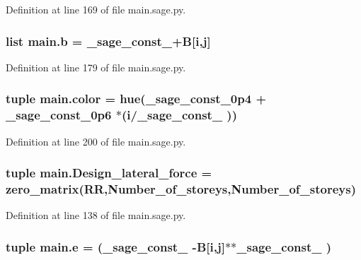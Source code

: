 Definition at line 169 of file main.\+sage.\+py.

\hypertarget{namespacemain_ab1e783015bffd2e1d395a9099143d967}{}
\subsubsection[{b}]{\setlength{\rightskip}{0pt plus 5cm}list main.\+b = \+\_\+sage\+\_\+const\+\_+{\bf B}\mbox{[}{\bf i},{\bf j}\mbox{]}}\label{namespacemain_ab1e783015bffd2e1d395a9099143d967}


Definition at line 179 of file main.\+sage.\+py.

\hypertarget{namespacemain_aeabbf69db1809807f065c2d1e9a62567}{}
\subsubsection[{color}]{\setlength{\rightskip}{0pt plus 5cm}tuple main.\+color = hue(\+\_\+sage\+\_\+const\+\_\+0p4 + \+\_\+sage\+\_\+const\+\_\+0p6 $\ast$({\bf i}/\+\_\+sage\+\_\+const\+\_ ))}\label{namespacemain_aeabbf69db1809807f065c2d1e9a62567}


Definition at line 200 of file main.\+sage.\+py.

\hypertarget{namespacemain_a0caf610899fee63b00acb7cce7c804d7}{}
\subsubsection[{Design\+\_\+lateral\+\_\+force}]{\setlength{\rightskip}{0pt plus 5cm}tuple main.\+Design\+\_\+lateral\+\_\+force = zero\+\_\+matrix(R\+R,Number\+\_\+of\+\_\+storeys,Number\+\_\+of\+\_\+storeys)}\label{namespacemain_a0caf610899fee63b00acb7cce7c804d7}


Definition at line 138 of file main.\+sage.\+py.

\hypertarget{namespacemain_aa7f4fe671f919f7f067f9337ef9e02c0}{}
\subsubsection[{e}]{\setlength{\rightskip}{0pt plus 5cm}tuple main.\+e = (\+\_\+sage\+\_\+const\+\_ -\/{\bf B}\mbox{[}{\bf i},{\bf j}\mbox{]}$\ast$$\ast${\bf \+\_\+sage\+\_\+const\+\_} )}\label{namespacemain_aa7f4fe671f919f7f067f9337ef9e02c0}


